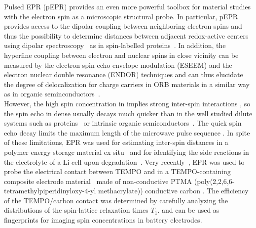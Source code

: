 Pulsed EPR (pEPR) provides an even more powerful toolbox for material studies with the electron spin as a microscopic structural probe. In particular, pEPR provides access to the dipolar coupling between neighboring electron spins and thus the possibility to determine distances between adjacent redox-active centers using dipolar spectroscopy~\cite{Salikhov1981} as in spin-labelled proteins~\cite{jeschke2012_annrevphyschem,Toropov1998}. In addition, the hyperfine coupling between electron and nuclear spins in close vicinity can be measured by the electron spin echo envelope modulation (ESEEM) and the electron nuclear double resonance (ENDOR) techniques and can thus elucidate the degree of delocalization for charge carriers in ORB materials in a similar way as in organic seminconductors~\cite{Behrends2011}.\\

However, the high spin concentration in  implies strong inter-spin interactions , so the spin echo in  dense usually decays much quicker than in the well studied dilute systems such as proteins~\cite{jeschke2012_annrevphyschem} or intrinsic organic semiconductors~\cite{Tait2021}. The quick spin echo decay limits the maximum length of the microwave pulse sequence . In spite of these limitations, EPR was used for estimating inter-spin distances in a polymer energy storage material ex situ~\cite{Assumma2020} and for identifying the side reactions in the electrolyte of a Li cell upon degradation~\cite{Szczuka2021}. Very recently~\cite{Daniel2023}, EPR was used to probe the electrical contact between TEMPO and   in a TEMPO-containing composite electrode material~\cite{IWASA2007} made of non-conductive PTMA (poly(2,2,6,6- tetramethylpiperidinyloxy-4-yl methacrylate))  conductive carbon . The efficiency of the TEMPO/carbon contact was determined by carefully analyzing the distributions of the spin-lattice relaxation times $T_1$.  and can be used as fingerprints for imaging spin concentrations in battery electrodes.\\






